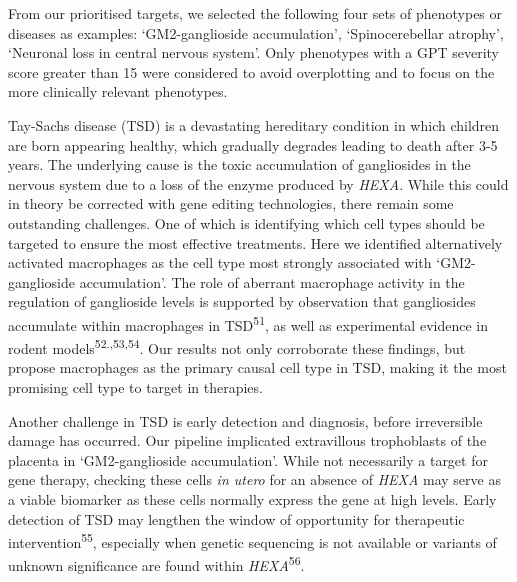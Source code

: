 \documentclass[
]{agujournal2019}
\begin{document}
From our prioritised targets, we selected the following four sets of
phenotypes or diseases as examples: `GM2-ganglioside accumulation',
`Spinocerebellar atrophy', `Neuronal loss in central nervous system'.
Only phenotypes with a GPT severity score greater than 15 were
considered to avoid overplotting and to focus on the more clinically
relevant phenotypes.

Tay-Sachs disease (TSD) is a devastating hereditary condition in which
children are born appearing healthy, which gradually degrades leading to
death after 3-5 years. The underlying cause is the toxic accumulation of
gangliosides in the nervous system due to a loss of the enzyme produced
by \emph{HEXA}. While this could in theory be corrected with gene
editing technologies, there remain some outstanding challenges. One of
which is identifying which cell types should be targeted to ensure the
most effective treatments. Here we identified alternatively activated
macrophages as the cell type most strongly associated with
`GM2-ganglioside accumulation'. The role of aberrant macrophage activity
in the regulation of ganglioside levels is supported by observation that
gangliosides accumulate within macrophages in TSD\textsuperscript{51},
as well as experimental evidence in rodent
models\textsuperscript{52.,53,54}. Our results not only corroborate
these findings, but propose macrophages as the primary causal cell type
in TSD, making it the most promising cell type to target in therapies.

Another challenge in TSD is early detection and diagnosis, before
irreversible damage has occurred. Our pipeline implicated extravillous
trophoblasts of the placenta in `GM2-ganglioside accumulation'. While
not necessarily a target for gene therapy, checking these cells \emph{in
utero} for an absence of \emph{HEXA} may serve as a viable biomarker as
these cells normally express the gene at high levels. Early detection of
TSD may lengthen the window of opportunity for therapeutic
intervention\textsuperscript{55}, especially when genetic sequencing is
not available or variants of unknown significance are found within
\emph{HEXA}\textsuperscript{56}.
\end{document}

